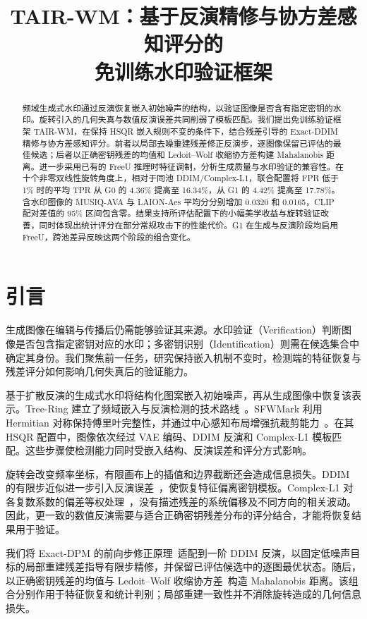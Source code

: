 \documentclass[10pt,twocolumn,letterpaper]{article}
\title{TAIR-WM：基于反演精修与协方差感知评分的\\免训练水印验证框架}
\author{}
\date{}
\begin{document}
\maketitle
\begin{abstract}
频域生成式水印通过反演恢复嵌入初始噪声的结构，以验证图像是否含有指定密钥的水印。旋转引入的几何失真与数值反演误差共同削弱了模板匹配。我们提出免训练验证框架 TAIR-WM，在保持 HSQR 嵌入规则不变的条件下，结合残差引导的 Exact-DDIM 精修与协方差感知评分。前者以局部去噪重建残差修正反演步，逐图像保留已评估的最佳候选；后者以正确密钥残差的均值和 Ledoit--Wolf 收缩协方差构建 Mahalanobis 距离。进一步采用已有的 FreeU 推理时特征调制，分析生成质量与水印验证的兼容性。在十个非零双线性旋转角度上，相对于同池 DDIM/Complex-L1，联合配置将 FPR 低于 1\% 时的平均 TPR 从 G0 的 4.36\% 提高至 16.34\%，从 G1 的 4.42\% 提高至 17.78\%。含水印图像的 MUSIQ-AVA 与 LAION-Aes 平均分分别增加 0.0320 和 0.0165，CLIP 配对差值的 95\% 区间包含零。结果支持所评估配置下的小幅美学收益与旋转验证改善，同时体现出统计评分在部分常规攻击下的性能代价。G1 在生成与反演阶段均启用 FreeU，跨池差异反映这两个阶段的组合变化。
\end{abstract}

\section{引言}
生成图像在编辑与传播后仍需能够验证其来源。水印验证（Verification）判断图像是否包含指定密钥对应的水印；多密钥识别（Identification）则需在候选集合中确定其身份。我们聚焦前一任务，研究保持嵌入机制不变时，检测端的特征恢复与残差评分如何影响几何失真后的验证能力。

基于扩散反演的生成式水印将结构化图案嵌入初始噪声，再从生成图像中恢复该表示。Tree-Ring 建立了频域嵌入与反演检测的技术路线~\cite{treering2023}。SFWMark 利用 Hermitian 对称保持傅里叶完整性，并通过中心感知布局增强抗裁剪能力~\cite{sfw2025}。在其 HSQR 配置中，图像依次经过 VAE 编码、DDIM 反演和 Complex-L1 模板匹配。这些步骤使检测能力同时受嵌入结构、反演误差和评分方式影响。

旋转会改变频率坐标，有限画布上的插值和边界截断还会造成信息损失。DDIM 的有限步近似进一步引入反演误差~\cite{ddim2021,exactdpm2024}，使恢复特征偏离密钥模板。Complex-L1 对各复数系数的偏差等权处理~\cite{sfw2025}，没有描述残差的系统偏移及不同方向的相关波动。因此，更一致的数值反演需要与适合正确密钥残差分布的评分结合，才能将恢复结果用于验证。

我们将 Exact-DPM 的前向步修正原理~\cite{exactdpm2024}适配到一阶 DDIM 反演，以固定低噪声目标的局部重建残差指导有限步精修，并保留已评估候选中的逐图最优状态。随后，以正确密钥残差的均值与 Ledoit--Wolf 收缩协方差~\cite{ledoit2004}构造 Mahalanobis 距离。该组合分别作用于特征恢复和统计判别；局部重建一致性并不消除旋转造成的几何信息损失。
\end{document}
